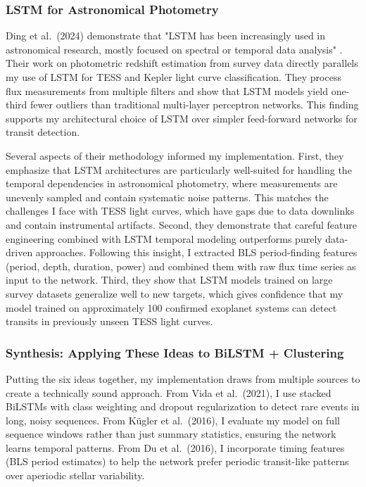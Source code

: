 \documentclass[letterpaper]{article} %
\begin{document}
\subsubsection{LSTM for Astronomical Photometry}

Ding et al.\ (2024) demonstrate that "LSTM has been increasingly used in astronomical research, mostly focused on spectral or temporal data analysis" \cite{Ding2024photometric}. Their work on photometric redshift estimation from survey data directly parallels my use of LSTM for TESS and Kepler light curve classification. They process flux measurements from multiple filters and show that LSTM models yield one-third fewer outliers than traditional multi-layer perceptron networks. This finding supports my architectural choice of LSTM over simpler feed-forward networks for transit detection.

Several aspects of their methodology informed my implementation. First, they emphasize that LSTM architectures are particularly well-suited for handling the temporal dependencies in astronomical photometry, where measurements are unevenly sampled and contain systematic noise patterns. This matches the challenges I face with TESS light curves, which have gaps due to data downlinks and contain instrumental artifacts. Second, they demonstrate that careful feature engineering combined with LSTM temporal modeling outperforms purely data-driven approaches. Following this insight, I extracted BLS period-finding features (period, depth, duration, power) and combined them with raw flux time series as input to the network. Third, they show that LSTM models trained on large survey datasets generalize well to new targets, which gives confidence that my model trained on approximately 100 confirmed exoplanet systems can detect transits in previously unseen TESS light curves.

\subsubsection{Synthesis: Applying These Ideas to BiLSTM + Clustering}

Putting the six ideas together, my implementation draws from multiple sources to create a technically sound approach. From Vida et al.\ (2021), I use stacked BiLSTMs with class weighting and dropout regularization to detect rare events in long, noisy sequences. From Kügler et al.\ (2016), I evaluate my model on full sequence windows rather than just summary statistics, ensuring the network learns temporal patterns. From Du et al.\ (2016), I incorporate timing features (BLS period estimates) to help the network prefer periodic transit-like patterns over aperiodic stellar variability.
\end{document}
